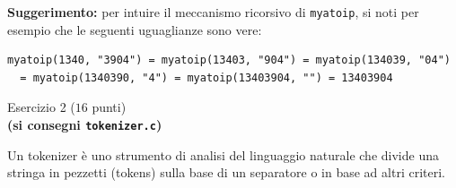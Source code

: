 \documentclass[12pt]{article}
\begin{document}
\textbf{Suggerimento:} per intuire il meccanismo ricorsivo di \texttt{myatoip}, si noti per
esempio che le seguenti uguaglianze sono vere:

\begin{mdframed}[backgroundcolor=verylightgray] 
\begin{verbatim}
myatoip(1340, "3904") = myatoip(13403, "904") = myatoip(134039, "04")
  = myatoip(1340390, "4") = myatoip(13403904, "") = 13403904
\end{verbatim}
\end{mdframed}

\vspace*{1ex}
\begin{center}{\Large Esercizio 2} ($16$ punti)\\
  \textbf{(si consegni \texttt{tokenizer.c})}
\end{center}
Un tokenizer è uno strumento di analisi del linguaggio naturale che divide una stringa in pezzetti (tokens) sulla base di un separatore o in base ad altri criteri.
\end{document}
